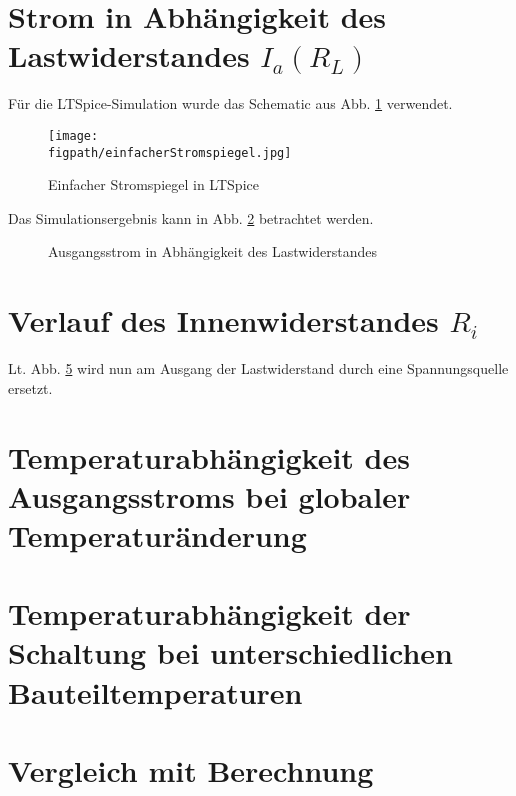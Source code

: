 \section{Strom in Abhängigkeit des Lastwiderstandes $I_a(R_L)$}
Für die LTSpice-Simulation wurde das Schematic aus Abb. \ref{fig_Kap4_02:SpiceSchematic} verwendet. 

\begin{figure}[H]
    \centering
    \texttt{[image: \\figpath/einfacherStromspiegel.jpg]}
    \caption{Einfacher Stromspiegel in LTSpice}
    \label{fig_Kap4_02:SpiceSchematic}
\end{figure}

Das Simulationsergebnis kann in Abb. \ref{fig_Kap4_03:Ia} betrachtet werden.

\begin{figure}[H]
	\centering \small
	\scalebox{0.9}{}
	\caption{Ausgangsstrom in Abhängigkeit des Lastwiderstandes}
	\label{fig_Kap4_03:Ia}
\end{figure}

\section{Verlauf des Innenwiderstandes $R_i$}
Lt. Abb. \ref{} wird nun am Ausgang der Lastwiderstand durch eine Spannungsquelle ersetzt. 

\section{Temperaturabhängigkeit des Ausgangsstroms bei globaler Temperaturänderung}

\section{Temperaturabhängigkeit der Schaltung bei unterschiedlichen Bauteiltemperaturen}

\section{Vergleich mit Berechnung}